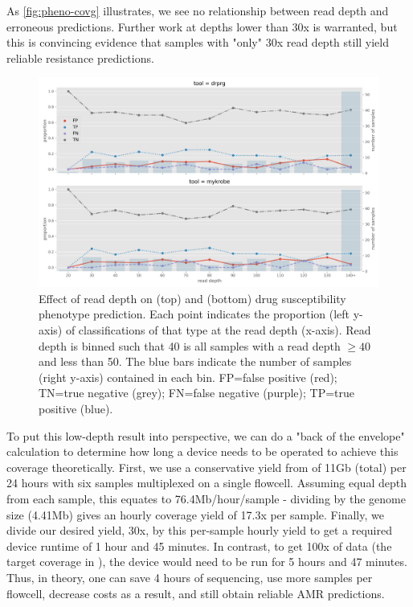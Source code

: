 As \autoref{fig:pheno-covg} illustrates, we see no relationship between \ont{} read depth and erroneous predictions. Further work at depths lower than 30x is warranted, but this is convincing evidence that samples with "only" 30x \ont{} read depth still yield reliable resistance predictions. 

\begin{figure}
\begin{center}
\includegraphics[width=0.90\columnwidth]{Chapter3/Figs/phenotype_coverage.png}
\caption{{Effect of \ont{} read depth on \drprg{} (top) and \mykrobe{} (bottom) drug susceptibility phenotype prediction. Each point indicates the proportion (left y-axis) of classifications of that type at the read depth (x-axis). Read depth is binned such that 40 is all samples with a read depth $\ge40$ and less than 50. The blue bars indicate the number of samples (right y-axis) contained in each bin. FP=false positive (red); TN=true negative (grey); FN=false negative (purple); TP=true positive (blue).
{\label{fig:pheno-covg}}
}}
\end{center}
\end{figure}

To put this low-depth result into perspective, we can do a "back of the envelope" calculation to determine how long a \ont{} device needs to be operated to achieve this coverage theoretically. First, we use a conservative yield from \cite{smith2020} of 11Gb (total) per 24 hours with six samples multiplexed on a single flowcell. Assuming equal depth from each sample, this equates to 76.4Mb/hour/sample - dividing by the \mtb{} genome size (4.41Mb) gives an hourly coverage yield of 17.3x per sample. Finally, we divide our desired yield, 30x, by this per-sample hourly yield to get a required device runtime of 1 hour and 45 minutes. In contrast, to get 100x of data (the target coverage in \cite{smith2020}), the \ont{} device would need to be run for 5 hours and 47 minutes. Thus, in theory, one can save 4 hours of sequencing, use more samples per flowcell, decrease costs as a result, and still obtain reliable AMR predictions.

